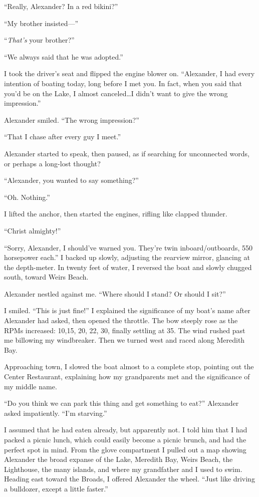 ``Really, Alexander? In a red bikini?''

``My brother insisted---''

``\emph{That's} your brother?''

``We always said that he was adopted.''

I took the driver's seat and flipped the engine blower on. ``Alexander,
I had every intention of boating today, long before I met you. In fact,
when you said that you'd be on the Lake, I almost canceled\ldots I
didn't want to give the wrong impression.''

Alexander smiled. ``The wrong impression?''

``That I chase after every guy I meet.''

Alexander started to speak, then paused, as if searching for unconnected
words, or perhaps a long-lost thought?

``Alexander, you wanted to say something?''

``Oh. Nothing.''

I lifted the anchor, then started the engines, rifling like clapped
thunder.

``Christ almighty!''

``Sorry, Alexander, I should've warned you. They're twin
inboard/outboards, 550 horsepower each.'' I backed up slowly, adjusting
the rearview mirror, glancing at the depth-meter. In twenty feet of
water, I reversed the boat and slowly chugged south, toward Weirs Beach.

Alexander nestled against me. ``Where should I stand? Or should I sit?''

I smiled. ``This is just fine!'' I explained the significance of my
boat's name after Alexander had asked, then opened the throttle. The bow
steeply rose as the RPMs increased: 10,15, 20, 22, 30, finally settling
at 35. The wind rushed past me billowing my windbreaker. Then we turned
west and raced along Meredith Bay.

Approaching town, I slowed the boat almost to a complete stop, pointing
out the Center Restaurant, explaining how my grandparents met and the
significance of my middle name.

``Do you think we can park this thing and get something to eat?''
Alexander asked impatiently. ``I'm starving.''

I assumed that he had eaten already, but apparently not. I told him that
I had packed a picnic lunch, which could easily become a picnic brunch,
and had the perfect spot in mind. From the glove compartment I pulled
out a map showing Alexander the broad expanse of the Lake, Meredith Bay,
Weirs Beach, the Lighthouse, the many islands, and where my grandfather
and I used to swim. Heading east toward the Broads, I offered Alexander
the wheel. ``Just like driving a bulldozer, except a little faster.''

